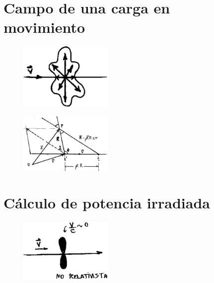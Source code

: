 \documentclass[10pt,oneside]{CBFT_book}
\begin{document}
\section{Campo de una carga en movimiento}

\begin{figure}[htb]
	\begin{center}
	\includegraphics[width=0.4\textwidth]{images/fig_ft1_campo_carga_mov.pdf}	 
	\end{center}
	\caption{}
\end{figure} 

\begin{figure}[htb]
	\begin{center}
	\includegraphics[width=0.4\textwidth]{images/fig_ft1_campo_carga_mov2.pdf}	 
	\end{center}
	\caption{}
\end{figure} 

\section{Cálculo de potencia irradiada}

\begin{figure}[htb]
	\begin{center}
	\includegraphics[width=0.4\textwidth]{images/fig_ft1_frenado2.pdf}	 
	\end{center}
	\caption{}
\end{figure} 
\end{document}
